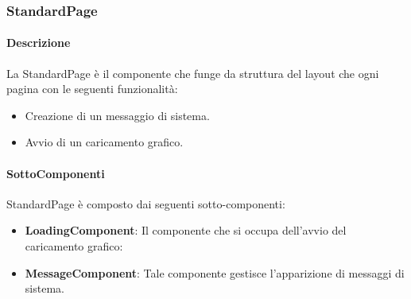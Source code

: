 \subsubsection{StandardPage} 
\label{sec:StandardPage}
\paragraph{Descrizione}
La StandardPage è il componente che funge da struttura del layout che ogni pagina con le seguenti funzionalità:
\begin{itemize}
    \item Creazione di un messaggio di sistema.
    \item Avvio di un caricamento grafico.
\end{itemize}  
\paragraph{SottoComponenti}
StandardPage è composto dai seguenti sotto-componenti:
\begin{itemize}
    \item \textbf{LoadingComponent}: Il componente che si occupa dell'avvio del caricamento grafico:
    \item \textbf{MessageComponent}: Tale componente gestisce l'apparizione di messaggi di sistema.
\end{itemize}